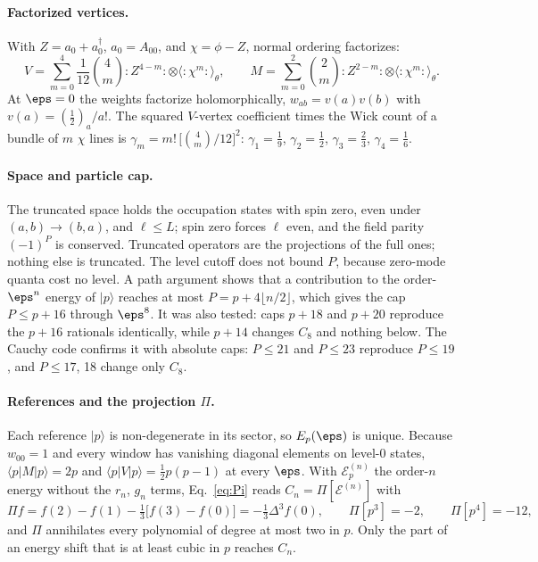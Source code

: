 \paragraph{Factorized vertices.} With $Z=a_0+a_0^\dagger$, $a_0=A_{00}$, and $\chi=\phi-Z$, normal ordering factorizes:
\begin{equation}
 V=\sum_{m=0}^4\frac1{12}\binom4m{:}Z^{4-m}{:}\otimes\langle{:}\chi^m{:}\rangle_\theta,\qquad
 M=\sum_{m=0}^2\binom2m{:}Z^{2-m}{:}\otimes\langle{:}\chi^m{:}\rangle_\theta .
 \label{d2:eq:factorize}
\end{equation}
At $\eps=0$ the weights factorize holomorphically, $w_{ab}=v(a)v(b)$ with $v(a)=(\frac12)_a/a!$. The squared
$V$-vertex coefficient times the Wick count of a bundle of $m$ $\chi$ lines is
$\gamma_m=m!\,\big[\binom4m/12\big]^2$: $\gamma_1=\frac19$, $\gamma_2=\frac12$, $\gamma_3=\frac23$, $\gamma_4=\frac16$.

\paragraph{Space and particle cap.} The truncated space holds the occupation states with spin zero, even under
$(a,b)\to(b,a)$, and $\ell\le L$; spin zero forces $\ell$ even, and the field parity $(-1)^P$ is conserved. Truncated
operators are the projections of the full ones; nothing else is truncated. The level cutoff does not bound $P$, because
zero-mode quanta cost no level. A path argument shows that a contribution to the order-$\eps^n$ energy of $|p\rangle$
reaches at most $P=p+4\lfloor n/2\rfloor$, which gives the cap $P\le p+16$ through $\eps^8$. It was also tested: caps
$p+18$ and $p+20$ reproduce the $p+16$ rationals identically, while $p+14$ changes $C_8$ and nothing below. The Cauchy
code confirms it with absolute caps: $P\le21$ and $P\le23$ reproduce $P\le19$, and $P\le17$, 18 change only $C_8$.

\paragraph{References and the projection $\Pi$.} Each reference $|p\rangle$ is non-degenerate in its sector, so $E_p(\eps)$
is unique. Because $w_{00}=1$ and every window has vanishing diagonal elements on level-0 states, $\langle p|M|p\rangle=2p$ and
$\langle p|V|p\rangle=\frac12p(p-1)$ at every $\eps$. With $\mathcal E_p^{(n)}$ the order-$n$ energy without the $r_n$,
$g_n$ terms, Eq.~\eqref{eq:Pi} reads $C_n=\Pi[\mathcal E^{(n)}]$ with
\begin{equation}
 \Pi f=f(2)-f(1)-\tfrac13\big[f(3)-f(0)\big]=-\tfrac13\Delta^3f(0),\qquad \Pi[p^3]=-2,\qquad \Pi[p^4]=-12 ,
 \label{d2:eq:Pi}
\end{equation}
and $\Pi$ annihilates every polynomial of degree at most two in $p$. Only the part of an energy shift that is at least
cubic in $p$ reaches $C_n$.

